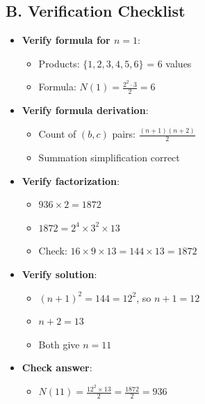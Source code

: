 \documentclass[12pt]{article}
\begin{document}
\begin{verificationbox}
\subsection*{B. Verification Checklist}
\begin{itemize}[leftmargin=*]
    \item \textbf{Verify formula for $n=1$}:
    \begin{itemize}
        \item Products: $\{1,2,3,4,5,6\}$ = 6 values
        \item Formula: $N(1) = \frac{2^2 \cdot 3}{2} = 6$ \checkmark
    \end{itemize}
    \item \textbf{Verify formula derivation}:
    \begin{itemize}
        \item Count of $(b,c)$ pairs: $\frac{(n+1)(n+2)}{2}$ \checkmark
        \item Summation simplification correct \checkmark
    \end{itemize}
    \item \textbf{Verify factorization}:
    \begin{itemize}
        \item $936 \times 2 = 1872$ \checkmark
        \item $1872 = 2^4 \times 3^2 \times 13$ \checkmark
        \item Check: $16 \times 9 \times 13 = 144 \times 13 = 1872$ \checkmark
    \end{itemize}
    \item \textbf{Verify solution}:
    \begin{itemize}
        \item $(n+1)^2 = 144 = 12^2$, so $n+1 = 12$ \checkmark
        \item $n+2 = 13$ \checkmark
        \item Both give $n = 11$ \checkmark
    \end{itemize}
    \item \textbf{Check answer}:
    \begin{itemize}
        \item $N(11) = \frac{12^2 \times 13}{2} = \frac{1872}{2} = 936$ \checkmark
    \end{itemize}
\end{itemize}


\end{verificationbox}
\end{document}
